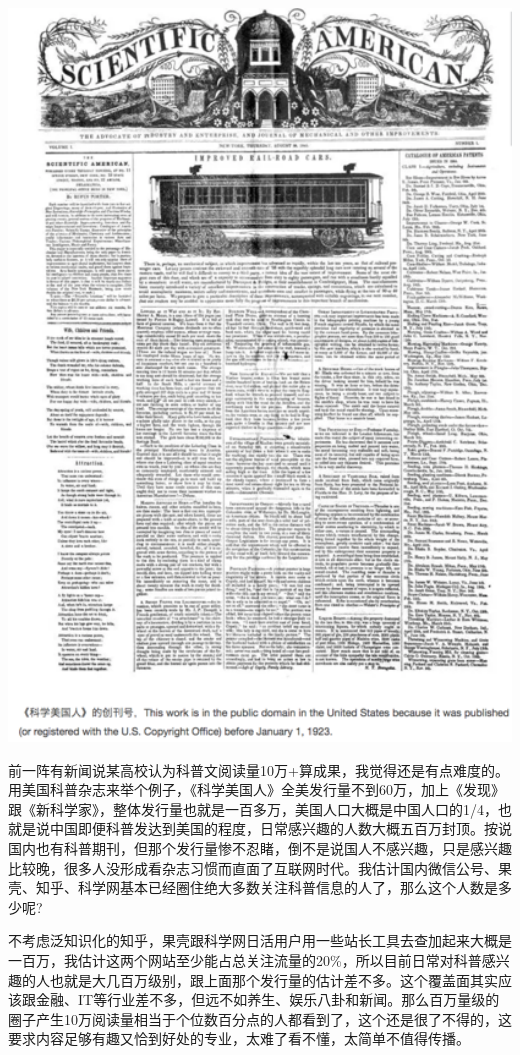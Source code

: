 \documentclass[]{book}
\begin{document}
\includegraphics[width=5.72in]{images/pops1}

前一阵有新闻说某高校认为科普文阅读量10万+算成果，我觉得还是有点难度的。用美国科普杂志来举个例子，《科学美国人》全美发行量不到60万，加上《发现》跟《新科学家》，整体发行量也就是一百多万，美国人口大概是中国人口的1/4，也就是说中国即便科普发达到美国的程度，日常感兴趣的人数大概五百万封顶。按说国内也有科普期刊，但那个发行量惨不忍睹，倒不是说国人不感兴趣，只是感兴趣比较晚，很多人没形成看杂志习惯而直面了互联网时代。我估计国内微信公号、果壳、知乎、科学网基本已经圈住绝大多数关注科普信息的人了，那么这个人数是多少呢?

不考虑泛知识化的知乎，果壳跟科学网日活用户用一些站长工具去查加起来大概是一百万，我估计这两个网站至少能占总关注流量的20\%，所以目前日常对科普感兴趣的人也就是大几百万级别，跟上面那个发行量的估计差不多。这个覆盖面其实应该跟金融、IT等行业差不多，但远不如养生、娱乐八卦和新闻。那么百万量级的圈子产生10万阅读量相当于个位数百分点的人都看到了，这个还是很了不得的，这要求内容足够有趣又恰到好处的专业，太难了看不懂，太简单不值得传播。
\end{document}
